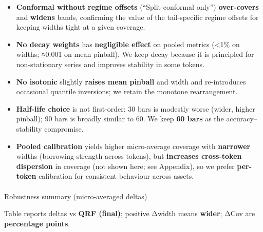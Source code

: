 \documentclass[
  a4paper,
  DIV=11,
  numbers=noendperiod]{scrreprt}
\makeatletter
\let\oldparagraph\paragraph
\renewcommand{\paragraph}{
    \@ifstar
      \xxxParagraphStar
      \xxxParagraphNoStar
  }
\newcommand{\xxxParagraphStar}[1]{\oldparagraph*{#1}\mbox{}}
\newcommand{\xxxParagraphNoStar}[1]{\oldparagraph{#1}\mbox{}}
\providecommand{\tightlist}{%
  \setlength{\itemsep}{0pt}\setlength{\parskip}{0pt}}
\makeatother
\begin{document}
\begin{itemize}
\tightlist
\item
  \textbf{Conformal without regime offsets} (``Split-conformal only'')
  \textbf{over-covers} and \textbf{widens} bands, confirming the value
  of the tail-specific regime offsets for keeping widths tight at a
  given coverage.
\item
  \textbf{No decay weights} has \textbf{negligible effect} on pooled
  metrics (\textless1\% on widths; ≈0.001 on mean pinball). We keep
  decay because it is principled for non-stationary series and improves
  stability in some tokens.
\item
  \textbf{No isotonic} slightly \textbf{raises mean pinball} and width
  and re-introduces occasional quantile inversions; we retain the
  monotone rearrangement.
\item
  \textbf{Half-life choice} is not first-order: 30 bars is modestly
  worse (wider, higher pinball); 90 bars is broadly similar to 60. We
  keep \textbf{60 bars} as the accuracy--stability compromise.
\item
  \textbf{Pooled calibration} yields higher micro-average coverage with
  \textbf{narrower} widths (borrowing strength across tokens), but
  \textbf{increases cross-token dispersion} in coverage (not shown here;
  see Appendix), so we prefer \textbf{per-token} calibration for
  consistent behaviour across assets.
\end{itemize}

\paragraph{Robustness summary (micro-averaged
deltas)}\label{robustness-summary-micro-averaged-deltas}

Table reports deltas vs \textbf{QRF (final)}; positive Δwidth means
\textbf{wider}; ΔCov are \textbf{percentage points}.
\end{document}
